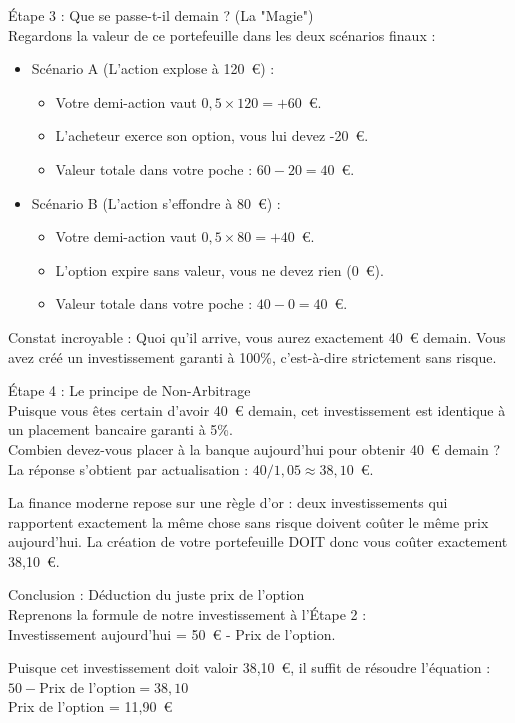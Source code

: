 \begin{intuitionbox}
\vspace{0.4cm}
Étape 3 : Que se passe-t-il demain ? (La "Magie")\\
Regardons la valeur de ce portefeuille dans les deux scénarios finaux :
\begin{itemize}[label=$\rightarrow$]
    \item Scénario A (L'action explose à 120~€) :
    \begin{itemize}[label=$\cdot$]
        \item Votre demi-action vaut $0,5 \times 120 = +60$~€.
        \item L'acheteur exerce son option, vous lui devez -20~€.
        \item Valeur totale dans votre poche : $60 - 20 = 40$~€.
    \end{itemize}
    \vspace{0.2cm}
    \item Scénario B (L'action s'effondre à 80~€) :
    \begin{itemize}[label=$\cdot$]
        \item Votre demi-action vaut $0,5 \times 80 = +40$~€.
        \item L'option expire sans valeur, vous ne devez rien (0~€).
        \item Valeur totale dans votre poche : $40 - 0 = 40$~€.
    \end{itemize}
\end{itemize}
Constat incroyable : Quoi qu'il arrive, vous aurez exactement 40~€ demain. Vous avez créé un investissement garanti à 100\%, c'est-à-dire strictement sans risque.

\vspace{0.4cm}
Étape 4 : Le principe de Non-Arbitrage\\
Puisque vous êtes certain d'avoir 40~€ demain, cet investissement est identique à un placement bancaire garanti à 5\%. \\
Combien devez-vous placer à la banque aujourd'hui pour obtenir 40~€ demain ? \\
La réponse s'obtient par actualisation : $40 / 1,05 \approx 38,10$~€.

La finance moderne repose sur une règle d'or : deux investissements qui rapportent exactement la même chose sans risque doivent coûter le même prix aujourd'hui. La création de votre portefeuille DOIT donc vous coûter exactement 38,10~€.

\vspace{0.4cm}
Conclusion : Déduction du juste prix de l'option\\
Reprenons la formule de notre investissement à l'Étape 2 : \\
Investissement aujourd'hui = 50~€ - Prix de l'option.

Puisque cet investissement doit valoir 38,10~€, il suffit de résoudre l'équation :\\
$50 - \text{Prix de l'option} = 38,10$ \\
Prix de l'option = 11,90~€
\end{intuitionbox}

